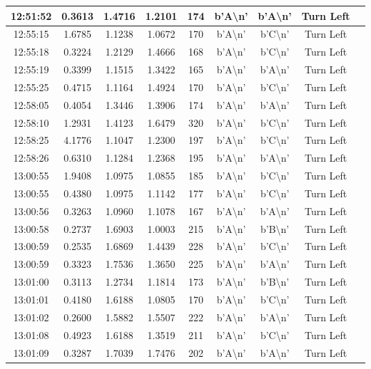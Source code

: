 \begin{table}[H]
\begin{tabular}{|c|c|c|c|c|c|c|c|c|}
    12:51:52 & 0.3613 & 1.4716 & 1.2101 & 174 & b'A\textbackslash n' & b'A\textbackslash n' & Turn Left \\ \hline
    12:55:15 & 1.6785 & 1.1238 & 1.0672 & 170 & b'A\textbackslash n' & b'C\textbackslash n' & Turn Left \\ \hline
    12:55:18 & 0.3224 & 1.2129 & 1.4666 & 168 & b'A\textbackslash n' & b'C\textbackslash n' & Turn Left \\ \hline
    12:55:19 & 0.3399 & 1.1515 & 1.3422 & 165 & b'A\textbackslash n' & b'A\textbackslash n' & Turn Left \\ \hline
    12:55:25 & 0.4715 & 1.1164 & 1.4924 & 170 & b'A\textbackslash n' & b'C\textbackslash n' & Turn Left \\ \hline
    12:58:05 & 0.4054 & 1.3446 & 1.3906 & 174 & b'A\textbackslash n' & b'A\textbackslash n' & Turn Left \\ \hline
    12:58:10 & 1.2931 & 1.4123 & 1.6479 & 320 & b'A\textbackslash n' & b'C\textbackslash n' & Turn Left \\ \hline
    12:58:25 & 4.1776 & 1.1047 & 1.2300 & 197 & b'A\textbackslash n' & b'C\textbackslash n' & Turn Left \\ \hline
    12:58:26 & 0.6310 & 1.1284 & 1.2368 & 195 & b'A\textbackslash n' & b'A\textbackslash n' & Turn Left \\ \hline
    13:00:55 & 1.9408 & 1.0975 & 1.0855 & 185 & b'A\textbackslash n' & b'C\textbackslash n' & Turn Left \\ \hline
    13:00:55 & 0.4380 & 1.0975 & 1.1142 & 177 & b'A\textbackslash n' & b'C\textbackslash n' & Turn Left \\ \hline
    13:00:56 & 0.3263 & 1.0960 & 1.1078 & 167 & b'A\textbackslash n' & b'A\textbackslash n' & Turn Left \\ \hline
    13:00:58 & 0.2737 & 1.6903 & 1.0003 & 215 & b'A\textbackslash n' & b'B\textbackslash n' & Turn Left \\ \hline
    13:00:59 & 0.2535 & 1.6869 & 1.4439 & 228 & b'A\textbackslash n' & b'C\textbackslash n' & Turn Left \\ \hline
    13:00:59 & 0.3323 & 1.7536 & 1.3650 & 225 & b'A\textbackslash n' & b'A\textbackslash n' & Turn Left \\ \hline
    13:01:00 & 0.3113 & 1.2734 & 1.1814 & 173 & b'A\textbackslash n' & b'B\textbackslash n' & Turn Left \\ \hline
    13:01:01 & 0.4180 & 1.6188 & 1.0805 & 170 & b'A\textbackslash n' & b'C\textbackslash n' & Turn Left \\ \hline
    13:01:02 & 0.2600 & 1.5882 & 1.5507 & 222 & b'A\textbackslash n' & b'A\textbackslash n' & Turn Left \\ \hline
    13:01:08 & 0.4923 & 1.6188 & 1.3519 & 211 & b'A\textbackslash n' & b'C\textbackslash n' & Turn Left \\ \hline
    13:01:09 & 0.3287 & 1.7039 & 1.7476 & 202 & b'A\textbackslash n' & b'A\textbackslash n' & Turn Left \\ \hline
\end{tabular}
\end{table}

